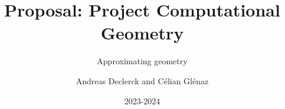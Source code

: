\documentclass[]{book}
\title{Proposal: Project Computational Geometry}
\subtitle{Approximating geometry}
\author{Andreas Declerck and Célian Glénaz}
\date{2023-2024}
\begin{document}
\maketitle

\tableofcontents


\nocite{*}
\printbibliography
\end{document}
